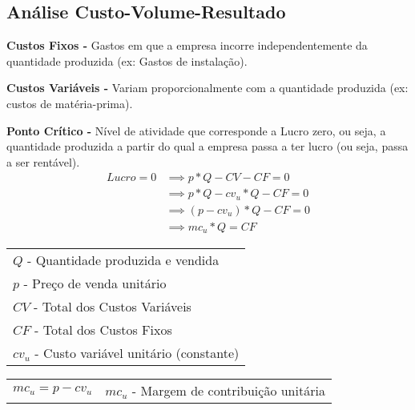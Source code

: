 \documentclass[11pt]{article}
\begin{document}
\newpage

\subsection{Análise Custo-Volume-Resultado}

\textbf{Custos Fixos -} Gastos em que a empresa incorre independentemente da quantidade produzida (ex: Gastos de instalação).

\textbf{Custos Variáveis -} Variam proporcionalmente com a quantidade produzida (ex: custos de matéria-prima).

\textbf{Ponto Crítico -} Nível de atividade que corresponde a Lucro zero, ou seja, a quantidade produzida a partir do qual a empresa passa a ter lucro (ou seja, passa a ser rentável).
\begin{align*}
    Lucro = 0 & \implies p * Q - CV - CF = 0       \\
              & \implies p * Q - cv_u * Q - CF = 0 \\
              & \implies (p - cv_u) * Q - CF = 0   \\
              & \implies mc_u * Q = CF
\end{align*}
\begin{center}
    \begin{tabular}{l}
        $Q$ - Quantidade produzida e vendida         \\
        $p$ - Preço de venda unitário                \\
        $CV$ - Total dos Custos Variáveis            \\
        $CF$ - Total dos Custos Fixos                \\
        $cv_u$ - Custo variável unitário (constante) \\
    \end{tabular}
\end{center}

\begin{tabular}{ c c }
    \begin{minipage}{0.45\textwidth}
        \begin{equation*}
            mc_u = p - cv_u
        \end{equation*}
    \end{minipage} &
    \begin{minipage}{0.45\textwidth}
        $mc_u$ - Margem de contribuição unitária
    \end{minipage}
\end{tabular}
\end{document}
